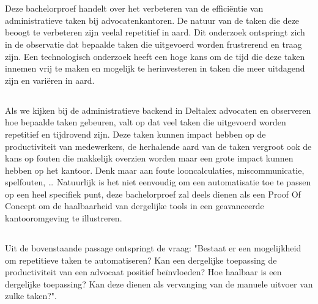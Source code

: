 
\chapter{}%
Deze bachelorproef handelt over het verbeteren van de efficiëntie van administratieve taken bij advocatenkantoren.
De natuur van de taken die deze beoogt te verbeteren zijn veelal repetitief in aard.
Dit onderzoek ontspringt zich in de observatie dat bepaalde taken die uitgevoerd worden frustrerend en traag zijn.
Een technologisch onderzoek heeft een hoge kans om de tijd die deze taken innemen vrij te maken en mogelijk te herinvesteren in taken die meer uitdagend zijn en variëren in aard.

\section{}%
\label{sec:probleemstelling}

Als we kijken bij de administratieve backend in Deltalex advocaten en observeren hoe bepaalde taken gebeuren, valt op dat veel taken die uitgevoerd worden repetitief en tijdrovend zijn.
Deze taken kunnen impact hebben op de productiviteit van medewerkers, de herhalende aard van de taken vergroot
ook de kans op fouten die makkelijk overzien worden maar een grote impact kunnen hebben op het kantoor.
Denk maar aan foute looncalculaties, miscommunicatie, spelfouten, \dots
Natuurlijk is het niet eenvoudig om een automatisatie toe te passen op een heel specifiek punt, deze bachelorproef zal deels dienen als een Proof Of Concept om de haalbaarheid van
dergelijke tools in een geavanceerde kantooromgeving te illustreren.

\section{}%
\label{sec:onderzoeksvraag}

Uit de bovenstaande passage ontspringt de vraag:
"Bestaat er een mogelijkheid om repetitieve taken te automatiseren?
Kan een dergelijke toepassing de productiviteit van een advocaat positief beïnvloeden?
Hoe haalbaar is een dergelijke toepassing?
Kan deze dienen als vervanging van de manuele uitvoer van zulke taken?".

